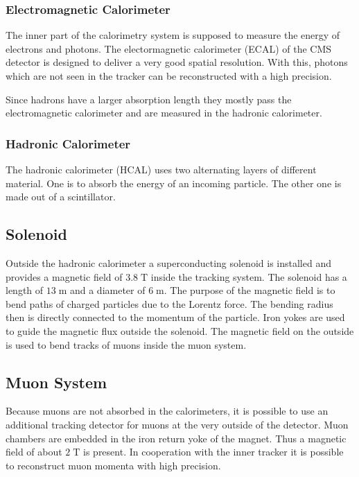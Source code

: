 \subsubsection{Electromagnetic Calorimeter}
	The inner part of the calorimetry system is supposed to measure the energy of electrons and photons. The electormagnetic calorimeter (ECAL) of the CMS detector is designed to deliver a very good spatial resolution. With this, photons which are not seen in the tracker can be reconstructed with a high precision.
	
	Since hadrons have a larger absorption length they mostly pass the electromagnetic calorimeter and are measured in the hadronic calorimeter.
\subsubsection{Hadronic Calorimeter}
	The hadronic calorimeter (HCAL) uses two alternating layers of different material. One is to absorb the energy of an incoming particle. The other one is made out of a scintillator.
	
\subsection{Solenoid}
	Outside the hadronic calorimeter a superconducting solenoid is installed and provides a magnetic field of $3.8\;\text{T}$ inside the tracking system. The solenoid has a length of $13\;\text{m}$ and a diameter of $6\;\text{m}$. The purpose of the magnetic field is to bend paths of charged particles due to the Lorentz force. The bending radius then is directly connected to the momentum of the particle. Iron yokes are used to guide the magnetic flux outside the solenoid. The magnetic field on the outside is used to bend tracks of muons inside the muon system.  
\subsection{Muon System}
\label{sec:muonsystem}
	Because muons are not absorbed in the calorimeters, it is possible to use an additional tracking detector for muons at the very outside of the detector. Muon chambers are embedded in the iron return yoke of the magnet. Thus a magnetic field of about $2\;\text{T}$ is present.
	In cooperation with the inner tracker it is possible to reconstruct muon momenta with high precision.
